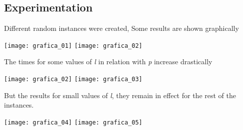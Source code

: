 
\subsection{Experimentation}
\begin{frame}
  
  Different random instances were created,
  Some results are shown graphically
  \begin{center}
    \texttt{[image: grafica\_01]}
    \texttt{[image: grafica\_02]}
  \end{center}
\end{frame}

\begin{frame}

  The times for some values of \textit{l} in relation with \textit{p} 
  increase drastically
  \begin{center}
    \texttt{[image: grafica\_02]}
    \texttt{[image: grafica\_03]}
  \end{center}
  
\end{frame}

\begin{frame}

  But the results for small values of \textit{l},
  they remain in effect for the rest of the instances.
  \begin{center}
    \texttt{[image: grafica\_04]}
    \texttt{[image: grafica\_05]}
  \end{center}
  
\end{frame}

